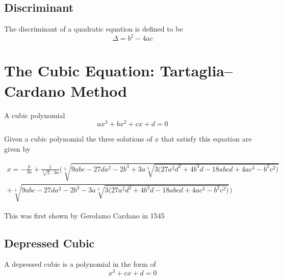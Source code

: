 \documentclass[a4paper]{article}
\begin{document}
\subsection{Discriminant}\label{eps:subsec:discriminant}

The discriminant of a quadratic equation is defined to be
\begin{equation}
  \Delta = b^2 - 4ac\label{eps:eq:equation2}
\end{equation}

\section{The Cubic Equation: Tartaglia--Cardano Method}\label{eps:sec:cubic}

\begin{definition}\label{eps:cubic def}
  A cubic polynomial
  \[
    ax^3 + bx^2 + cx + d = 0
  \]
\end{definition}

Given a cubic polynomial the three solutions of $x$ that satisfy this equation are given by

\begin{equation} \label{eps:eq:cubic-solution}
  \boxed{
    \begin{split}
      x = - \frac{b}{3a} +
      \frac{1}{\sqrt[3]{2} \cdot 3 a} \Bigg(
      \sqrt[3]{9abc - 27 d a^2 - 2 b^3  + 3a \sqrt[2]{
          3 \Big(
          27 a^2 d^2 + 4 b^3 d - 18 abcd + 4 a c^3 - b^2 c^2
          \Big)
        }}
      \\
      +
      \sqrt[3]{9abc - 27 d a^2 - 2 b^3 -
        3a \sqrt[2]{
          3
          \Big(
          27 a^2 d^2 + 4 b^3 d - 18 abcd + 4 a c^3 - b^2 c^2
          \Big)
        }}
      \Bigg)
    \end{split}
  }
\end{equation}

This was first shown by Gerolamo Cardano in 1545

\subsection{Depressed Cubic}\label{eps:subsec:depressed-cubic}
\begin{definition}\label{eps:depressed cubic def}
  A depressed cubic is a polynomial in the form of
  \[
    x^3 + cx + d = 0
  \]
\end{definition}
\end{document}
